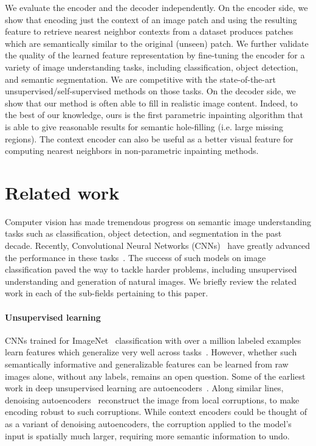 \documentclass[10pt,twocolumn,letterpaper]{article}
\begin{document}
We evaluate the encoder and the decoder independently.
On the encoder side, we show that encoding just the context of an image patch and using the resulting feature to retrieve nearest neighbor contexts from a dataset produces patches which are semantically similar to the original (unseen) patch.
We further validate the quality of the learned feature representation by fine-tuning the encoder for a variety of image understanding tasks, including classification, object detection, and semantic segmentation. We are competitive
with the state-of-the-art unsupervised/self-supervised methods on those tasks.
On the decoder side, we show that our method is often able to fill in realistic image content.
Indeed, to the best of our knowledge, ours is the first parametric inpainting algorithm that is able to give reasonable results for semantic hole-filling (i.e. large missing regions).  The context encoder can also be useful as a better visual feature for computing nearest neighbors in non-parametric inpainting methods.

\section{Related work}
Computer vision has made tremendous progress on semantic image understanding tasks such as classification, object detection, and segmentation in the past decade.
Recently, Convolutional Neural Networks (CNNs)~\cite{fukushima1980neocognitron,lecun1989backpropagation} have greatly advanced the performance in these tasks~\cite{krizhevsky2012imagenet,rcnn,long2014fully}.
The success of such models on image classification paved the way to tackle harder problems, including unsupervised understanding and generation of natural images.
We briefly review the related work in each of the sub-fields pertaining to this paper.

\paragraph{Unsupervised learning}
CNNs trained for ImageNet~\cite{imagenet} classification with over a million labeled examples learn features which generalize very well across tasks~\cite{donahue2013decaf}.
However, whether such semantically informative and generalizable features can be learned from raw images alone, without any labels, remains an open question.
Some of the earliest work in deep unsupervised learning are autoencoders~\cite{hintonautoenc,bengio2009learning}.
Along similar lines, denoising autoencoders~\cite{denoising} reconstruct the image from local corruptions, to make encoding robust to such corruptions.
While context encoders could be thought of as a variant of denoising autoencoders, the corruption applied to the model's input is spatially much larger, requiring more semantic information to undo.
\end{document}

